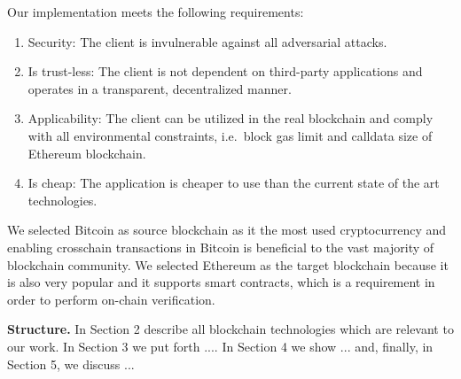 \bigbreak
Our implementation meets the following requirements:
\begin{enumerate}
\item Security: The client is invulnerable against all adversarial attacks.
\item Is trust-less: The client is not dependent on third-party applications
and operates in a transparent, decentralized manner.
\item Applicability: The client can be utilized in the real blockchain and
comply with all environmental constraints, i.e.\ block gas limit and calldata
size of Ethereum blockchain.
\item Is cheap: The application is cheaper to use than the current state of the
art technologies.
\end{enumerate}

We selected Bitcoin as source blockchain as it the most used cryptocurrency and
enabling crosschain transactions in Bitcoin is beneficial to the vast majority
of blockchain community. We selected Ethereum as the target blockchain because
it is also very popular and it supports smart contracts, which is a requirement
in order to perform on-chain verification.

\noindent

\textbf{Structure.} In Section 2 describe all blockchain technologies which are
relevant to our work. In Section 3 we put forth .... In Section 4 we show
... and, finally, in Section 5, we discuss ...


